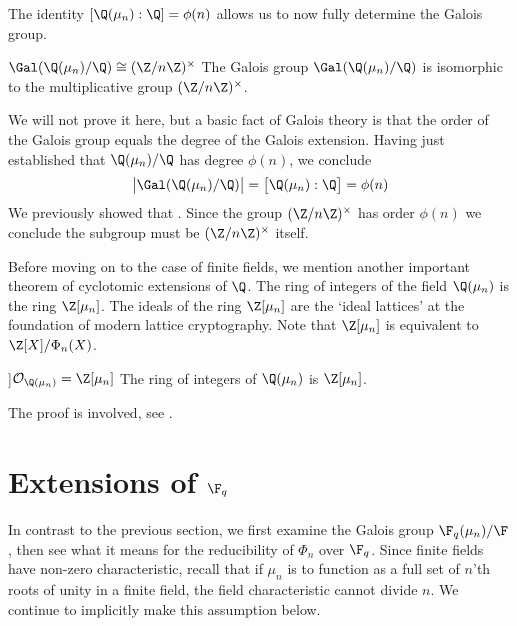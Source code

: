 The identity $[\Q(\mu_n):\Q]=\phi(n)$ allows us to now fully determine the Galois group.
\begin{corollary}{$\Gal(\Q(\mu_n)/\Q)\cong(\Z/n\Z)^\times$}
    The Galois group $\Gal(\Q(\mu_n)/\Q)$ is isomorphic to the multiplicative group $(\Z/n\Z)^\times$.

    \proof
    We will not prove it here, but a basic fact of Galois theory is that the order of the Galois group equals the degree of the Galois extension.
    Having just established that $\Q(\mu_n)/\Q$ has degree $\phi(n)$, we conclude
    \begin{equation}
        \big|\Gal(\Q(\mu_n)/\Q)\big| = \big[\Q(\mu_n) : \Q\big] = \phi(n)
    \end{equation}
    We previously showed that .
    Since the group $(\Z/n\Z)^\times$ has order $\phi(n)$ we conclude the subgroup must be $(\Z/n\Z)^\times$ itself.
\end{corollary}

Before moving on to the case of finite fields, we mention another important theorem of cyclotomic extensions of $\Q$.
The ring of integers of the field $\Q(\mu_n)$ is the ring $\Z[\mu_n]$.
The ideals of the ring $\Z[\mu_n]$ are the `ideal lattices' at the foundation of modern lattice cryptography.
Note that $\Z[\mu_n]$ is equivalent to $\Z[X]/\Phi_n(X)$.

\begin{theorem}[O_{Q(mu_n)} = Z[mu_n]]{$\mathcal{O}_{\Q(\mu_n)}=\Z[\mu_n]$}
    The ring of integers of $\Q(\mu_n)$ is $\Z[\mu_n]$.

    \proof
    The proof is involved, see \cite{Nguyen}.
\end{theorem}


\section[Extensions of F_q]{Extensions of $\F_q$}

In contrast to the previous section, we first examine the Galois group $\F_q(\mu_n)/\F$, then see what it means for the reducibility of $\Phi_n$ over $\F_q$.
Since finite fields have non-zero characteristic, recall that if $\mu_n$ is to function as a full set of $n$'th roots of unity in a finite field, the field characteristic cannot divide $n$.
We continue to implicitly make this assumption below.

